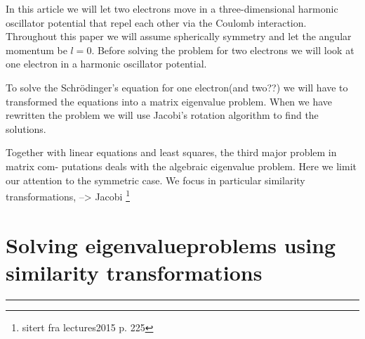 \documentclass[11pt,a4wide]{article}
\begin{document}
In this article we will let two electrons move in a three-dimensional harmonic oscillator potential that repel each other via the Coulomb interaction.  Throughout this paper we will assume spherically symmetry and let the angular momentum be $l=0$. Before solving the problem for two electrons we will look at one electron in a harmonic oscillator potential. 

To solve the Schr\"odinger's equation for one electron(and two??) we will have to transformed the equations into a matrix eigenvalue problem. When we have rewritten the problem we will use Jacobi's rotation algorithm to find the solutions. %

Together with linear equations and least squares, the third major problem in matrix com- putations deals with the algebraic eigenvalue problem. Here we limit our attention to the symmetric case. We focus in particular similarity transformations, --> Jacobi \footnote{sitert fra lectures2015 p. 225}


\section{Solving eigenvalueproblems using similarity transformations}



\noindent\rule{\textwidth}{1pt}
\end{document}
